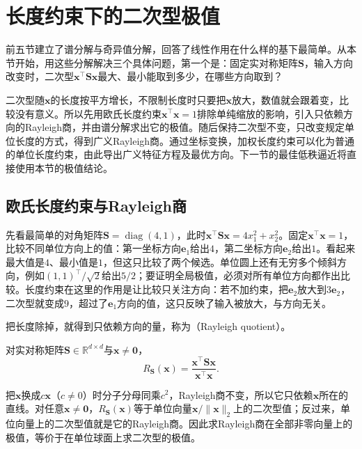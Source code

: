 
\section{长度约束下的二次型极值}
\label{sec:ls-quadratic-extrema}

前五节建立了谱分解与奇异值分解，回答了线性作用在什么样的基下最简单。从本节开始，用这些分解解决三个具体问题，第一个是：固定实对称矩阵$\bm S$，输入方向改变时，二次型$\bm x^\top\bm S\bm x$最大、最小能取到多少，在哪些方向取到？

二次型随$\bm x$的长度按平方增长，不限制长度时只要把$\bm x$放大，数值就会跟着变，比较没有意义。所以先用欧氏长度约束$\bm x^\top\bm x=1$排除单纯缩放的影响，引入只依赖方向的Rayleigh商，并由谱分解求出它的极值。随后保持二次型不变，只改变规定单位长度的方式，得到广义Rayleigh商。通过坐标变换，加权长度约束可以化为普通的单位长度约束，由此导出广义特征方程及最优方向。下一节的最佳低秩逼近将直接使用本节的极值结论。

\subsection{欧氏长度约束与Rayleigh商}
\label{sec:ls-rayleigh-extremal}

先看最简单的对角矩阵$\bm S=\operatorname{diag}(4,1)$，此时$\bm x^\top\bm S\bm x=4x_1^2+x_2^2$。固定$\bm x^\top\bm x=1$，比较不同单位方向上的值：第一坐标方向$\bm e_1$给出$4$，第二坐标方向$\bm e_2$给出$1$。看起来最大值是$4$、最小值是$1$，但这只比较了两个候选。单位圆上还有无穷多个倾斜方向，例如$(1,1)^\top/\sqrt2$给出$5/2$；要证明全局极值，必须对所有单位方向都作出比较。长度约束在这里的作用是让比较只关注方向：若不加约束，把$\bm e_2$放大到$3\bm e_2$，二次型就变成$9$，超过了$\bm e_1$方向的值，这只反映了输入被放大，与方向无关。

把长度除掉，就得到只依赖方向的量，称为（Rayleigh quotient）。
\begin{definition}[Rayleigh商]
\label{def:matrix-analysis-rayleigh-quotient}
对实对称矩阵$\bm S\in\mathbb R^{d\times d}$与$\bm x\neq\bm0$，
\begin{equation}
 R_{\bm S}(\bm x)=\frac{\bm x^\top\bm S\bm x}{\bm x^\top\bm x}.
 \label{eq:matrix-analysis-rayleigh-quotient}
\end{equation}
\end{definition}
把$\bm x$换成$c\bm x$（$c\neq0$）时分子分母同乘$c^2$，Rayleigh商不变，所以它只依赖$\bm x$所在的直线。对任意$\bm x\neq\bm0$，$R_{\bm S}(\bm x)$等于单位向量$\bm x/\lVert\bm x\rVert_2$上的二次型值；反过来，单位向量上的二次型值就是它的Rayleigh商。因此求Rayleigh商在全部非零向量上的极值，等价于在单位球面上求二次型的极值。

